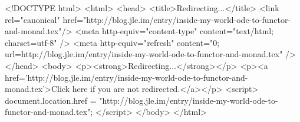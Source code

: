 <!DOCTYPE html>
<html>
<head>
<title>Redirecting...</title>
<link rel="canonical" href="http://blog.jle.im/entry/inside-my-world-ode-to-functor-and-monad.tex"/>
<meta http-equiv="content-type" content="text/html; charset=utf-8" />
<meta http-equiv="refresh" content="0; url=http://blog.jle.im/entry/inside-my-world-ode-to-functor-and-monad.tex" />
</head>
<body>
  <p><strong>Redirecting...</strong></p>
  <p><a href='http://blog.jle.im/entry/inside-my-world-ode-to-functor-and-monad.tex'>Click here if you are not redirected.</a></p>
  <script>
    document.location.href = "http://blog.jle.im/entry/inside-my-world-ode-to-functor-and-monad.tex";
  </script>
</body>
</html>
